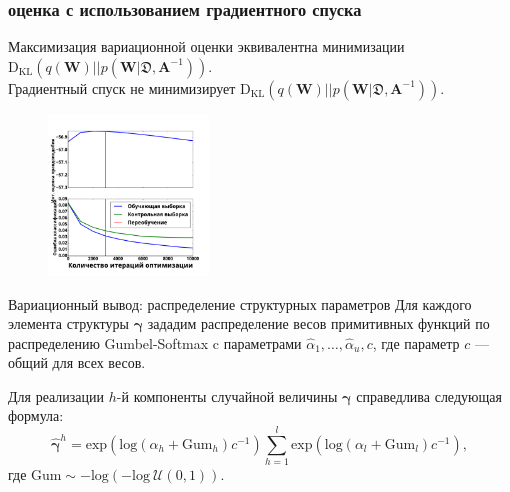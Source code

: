\documentclass[usenames,dvipsnames,11pt,pdf,utf8,russian,aspectratio=169]{beamer}
\begin{document}
\begin{frame}
\frametitle{ оценка с использованием градиентного спуска}
Максимизация вариационной оценки эквивалентна минимизации $\text{D}_{\text{KL}}(q(\mathbf{W})||p(\mathbf{W} | \mathfrak{D},\mathbf{A}^{-1}))$.\\
Градиентный спуск не минимизирует $\text{D}_{\text{KL}}(q(\mathbf{W})||p(\mathbf{W} | \mathfrak{D},\mathbf{A}^{-1}))$.
\begin{multicols}{2}

\begin{figure}
\end{figure}

\columnbreak


\begin{figure}
{\includegraphics[width=0.38\textwidth]{./slide_plots/sgd_show.pdf}}
\end{figure}
\end{multicols}
\end{frame}


\begin{frame}{Вариационный вывод: распределение структурных параметров}
Для каждого элемента структуры $\boldsymbol{\gamma}$ зададим распределение весов примитивных функций по распределению Gumbel-Softmax c параметрами $\hat{\alpha}_1, \dots, \hat{\alpha}_u, c$, где параметр $c$ --- общий для всех весов.

Для реализации $h$-й компоненты случайной величины $\boldsymbol{\gamma}$ справедлива следующая формула:
\[
    \hat{\boldsymbol{\gamma}}^h = \text{exp}\left(\text{log}\left(\alpha_h + \text{Gum}_h\right)c^{-1}\right) \sum_{h=1}^l \text{exp}\left(\text{log}\left(\alpha_l + \text{Gum}_l\right)c^{-1}\right),
\]
где $\text{Gum} \sim -\text{log}(-\text{log}~\mathcal{U}(0,1)).$ 
\end{frame}
\end{document}
